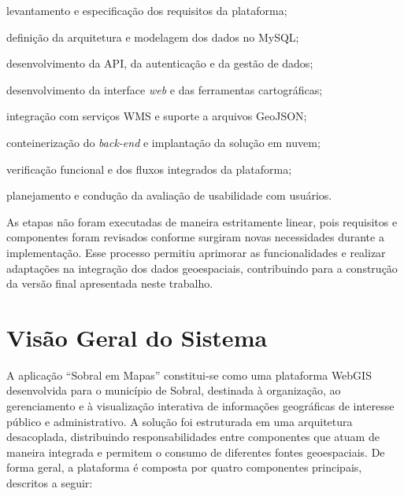 \begin{alineascomponto}

    \item levantamento e especificação dos requisitos da plataforma;

    \item definição da arquitetura e modelagem dos dados no MySQL;

    \item desenvolvimento da API, da autenticação e da gestão de dados;

    \item desenvolvimento da interface \textit{web} e das ferramentas cartográficas;

    \item integração com serviços WMS e suporte a arquivos GeoJSON;

    \item conteinerização do \textit{back-end} e implantação da solução em nuvem;

    \item verificação funcional e dos fluxos integrados da plataforma;

    \item planejamento e condução da avaliação de usabilidade com usuários.
\end{alineascomponto}

As etapas não foram executadas de maneira estritamente linear, pois requisitos e componentes foram revisados conforme surgiram novas necessidades durante a implementação. Esse processo permitiu aprimorar as funcionalidades e realizar adaptações na integração dos dados geoespaciais, contribuindo para a construção da versão final apresentada neste trabalho.

\section{Visão Geral do Sistema}
\label{sec:visao-geral}

A aplicação ``Sobral em Mapas'' constitui-se como uma plataforma WebGIS desenvolvida para o município de Sobral, destinada à organização, ao gerenciamento e à visualização interativa de informações geográficas de interesse público e administrativo. A solução foi estruturada em uma arquitetura desacoplada, distribuindo responsabilidades entre componentes que atuam de maneira integrada e permitem o consumo de diferentes fontes geoespaciais. De forma geral, a plataforma é composta por quatro componentes principais, descritos a seguir:

